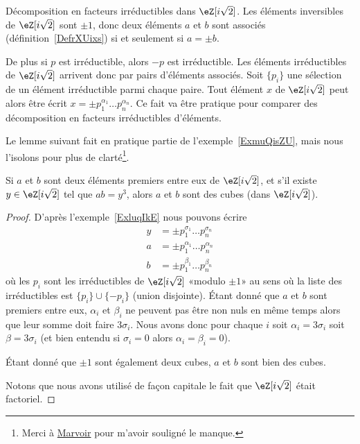 \begin{example} \label{ExluqIkE}
    Décomposition en facteurs irréductibles dans \( \eZ[i\sqrt{2}]\). Les éléments inversibles de \( \eZ[i\sqrt{2}]\) sont \( \pm 1\), donc deux éléments \( a\) et \( b\) sont associés (définition~\ref{DefrXUixs}) si et seulement si \( a=\pm b\).

    De plus si \( p\) est irréductible, alors \( -p\) est irréductible. Les éléments irréductibles de \( \eZ[i\sqrt{2}]\) arrivent donc par pairs d'éléments associés. Soit \( \{ p_i \}\) une sélection de un élément irréductible parmi chaque paire. Tout élément \( x\) de \( \eZ[i\sqrt{2}]\) peut alors être écrit \( x=\pm p_1^{\alpha_1}\ldots p_n^{\alpha_n}\). Ce fait va être pratique pour comparer des décomposition en facteurs irréductibles d'éléments.
\end{example}

Le lemme suivant fait en pratique partie de l'exemple~\ref{ExmuQisZU}, mais nous l'isolons pour plus de clarté\footnote{Merci à \href{http://fr.wikipedia.org/wiki/Utilisateur:Marvoir}{Marvoir} pour m'avoir souligné le manque.}.
\begin{lemma}       \label{LemTScCIv}
    Si \( a\) et \( b\) sont deux éléments premiers entre eux de \( \eZ[i\sqrt{2}]\), et s'il existe \( y \in  \eZ[i\sqrt{2}]\) tel que \( ab=y^3\), alors \( a\) et \( b\) sont des cubes (dans \( \eZ[i\sqrt{2}]\)).
\end{lemma}

\begin{proof}
    D'après l'exemple~\ref{ExluqIkE} nous pouvons écrire
    \begin{subequations}
        \begin{align}
            y&=\pm p_1^{\sigma_1}\ldots p_n^{\sigma_n}\\
            a&=\pm p_1^{\alpha_1}\ldots p_n^{\alpha_n}\\
            b&=\pm p_1^{\beta_1}\ldots p_n^{\beta_n}
        \end{align}
    \end{subequations}
    où les \( p_i\) sont les irréductibles de \( \eZ[i\sqrt{2}]\) «modulo \( \pm 1\)» au sens où la liste des irréductibles est \( \{ p_i \}\cup\{ -p_i \}\) (union disjointe). Étant donné que \( a\) et \( b\) sont premiers entre eux, \( \alpha_i\) et \( \beta_i\) ne peuvent pas être non nuls en même temps alors que leur somme doit faire \( 3\sigma_i\). Nous avons donc pour chaque \( i\) soit \( \alpha_i=3\sigma_i\) soit \( \beta=3\sigma_i\) (et bien entendu si \( \sigma_i=0\) alors \( \alpha_i=\beta_i=0\)).

    Étant donné que \( \pm 1\) sont également deux cubes, \( a\) et \( b\) sont bien des cubes.

    Notons que nous avons utilisé de façon capitale le fait que \( \eZ[i\sqrt{2}]\) était factoriel.
\end{proof}

